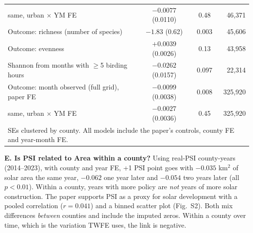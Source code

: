 \documentclass[11pt]{article}
\begin{document}
\begin{center}
\begin{tabular}{l c c r}
\quad same, urban $\times$ YM FE & $-0.0077$ (0.0110) & 0.48 & 46,371 \\
Outcome: richness (number of species) & $-1.83$ (0.62) & 0.003 & 45,606 \\
Outcome: evenness & $+0.0039$ (0.0026) & 0.13 & 43,958 \\
Shannon from months with $\ge$5 birding hours & $-0.0262$ (0.0157) & 0.097 & 22,314 \\
Outcome: month observed (full grid), paper FE & $-0.0099$ (0.0038) & 0.008 & 325,920 \\
\quad same, urban $\times$ YM FE & $-0.0027$ (0.0036) & 0.45 & 325,920 \\
\bottomrule
\multicolumn{4}{l}{\footnotesize SEs clustered by county. All models include the paper's controls, county FE and year-month FE.}
\end{tabular}
\end{center}

\textbf{E. Is PSI related to Area within a county?} Using real-PSI county-years (2014--2023), with county and year FE, +1 PSI point goes with $-0.035$ km$^2$ of solar area the same year, $-0.062$ one year later and $-0.054$ two years later (all $p<0.01$). Within a county, years with more policy are \emph{not} years of more solar construction. The paper supports PSI as a proxy for solar development with a pooled correlation ($r=0.041$) and a binned scatter plot (Fig.~S2). Both mix differences \emph{between} counties and include the imputed zeros. Within a county over time, which is the variation TWFE uses, the link is negative.
\end{document}
